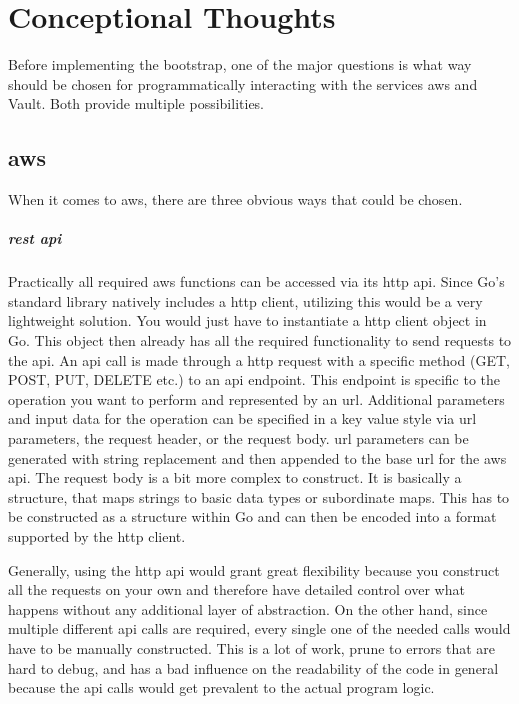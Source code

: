 \chapter{Conceptional Thoughts}
\label{sec:concept}
Before implementing the bootstrap, one of the major questions is what way should be chosen for programmatically interacting with the services \ac{aws} and Vault.
Both provide multiple possibilities.

\section{\ac{aws}}
When it comes to \ac{aws}, there are three obvious ways that could be chosen.

\paragraph{\acs{rest} \ac{api}}
Practically all required \ac{aws} functions can be accessed via its \ac{http} \ac{api}.
Since Go's standard library natively includes a \ac{http} client, utilizing this would be a very lightweight solution.
You would just have to instantiate a \ac{http} client object in Go.
This object then already has all the required functionality to send requests to the \ac{api}.
An \ac{api} call is made through a \ac{http} request with a specific method (GET, POST, PUT, DELETE etc.) to an \ac{api} endpoint.
This endpoint is specific to the operation you want to perform and represented by an \ac{url}.
Additional parameters and input data for the operation can be specified in a key value style via \ac{url} parameters, the request header, or the request body.
\ac{url} parameters can be generated with string replacement and then appended to the base \ac{url} for the \ac{aws} \ac{api}.
The request body is a bit more complex to construct.
It is basically a structure, that maps strings to basic data types or subordinate maps.
This has to be constructed as a structure within Go and can then be encoded into a format supported by the \ac{http} client.

Generally, using the \ac{http} \ac{api} would grant great flexibility because you construct all the requests on your own and therefore have detailed control over what happens without any additional layer of abstraction.
On the other hand, since multiple different \ac{api} calls are required, every single one of the needed calls would have to be manually constructed.
This is a lot of work, prune to errors that are hard to debug, and has a bad influence on the readability of the code in general because the \ac{api} calls would get prevalent to the actual program logic.

